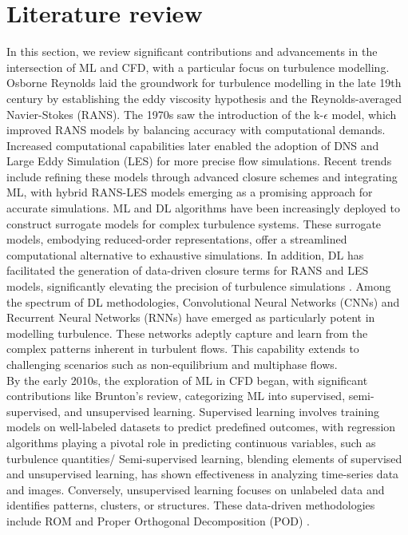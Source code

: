 \section{Literature review}
In this section, we review significant contributions and advancements in the intersection of ML and CFD, with a particular focus on turbulence modelling. Osborne Reynolds \cite{reynolds1895dynamical} laid the groundwork for turbulence modelling in the late 19th century by establishing the eddy viscosity hypothesis and the Reynolds-averaged Navier-Stokes (RANS). The 1970s saw the introduction of the k-$\epsilon$ \cite{launder1974application} model, which improved RANS models by balancing accuracy with computational demands. Increased computational capabilities later enabled the adoption of DNS and Large Eddy Simulation (LES) \cite{smagorinsky1963general} for more precise flow simulations. Recent trends include refining these models through advanced closure schemes and integrating ML, with hybrid RANS-LES models emerging as a promising approach for accurate simulations.
ML and DL algorithms have been increasingly deployed to construct surrogate models for complex turbulence systems. These surrogate models, embodying reduced-order representations, offer a streamlined computational alternative to exhaustive simulations. In addition, DL has facilitated the generation of data-driven closure terms for RANS and LES models, significantly elevating the precision of turbulence simulations \cite{ling2016}. Among the spectrum of DL methodologies, Convolutional Neural Networks (CNNs) and Recurrent Neural Networks (RNNs) have emerged as particularly potent in modelling turbulence. These networks adeptly capture and learn from the complex patterns inherent in turbulent flows. This capability extends to challenging scenarios such as non-equilibrium and multiphase flows. \\   
By the early 2010s, the exploration of ML in CFD began, with significant contributions like Brunton's review, \cite{brunton} categorizing ML into supervised, semi-supervised, and unsupervised learning. Supervised learning involves training models on well-labeled datasets to predict predefined outcomes, with regression algorithms playing a pivotal role in predicting continuous variables, such as turbulence quantities/ Semi-supervised learning, blending elements of supervised and unsupervised learning, has shown effectiveness in analyzing time-series data and images. Conversely, unsupervised learning focuses on unlabeled data and identifies patterns, clusters, or structures. These data-driven methodologies include ROM and Proper Orthogonal Decomposition (POD) \cite{berkooz1993proper}.\\
